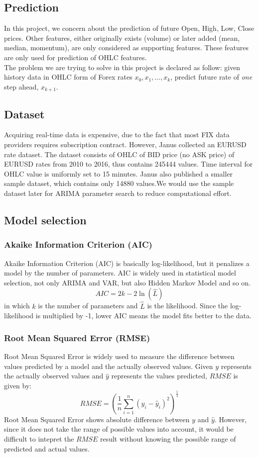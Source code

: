 \documentclass[11pt]{article}
\begin{document}

\subsection{Prediction}
In this project, we concern about the prediction of future Open, High, Low,
Close prices. Other features, either originally exists (volume) or later added
(mean, median, momentum), are only considered as supporting features. These
features are only used for prediction of OHLC features.\\
The problem we are trying to solve in this project is declared as follow: given
history data in OHLC form of Forex rates $x_0, x_1,\ldots,x_k$, predict future
rate of \textit{one} step ahead, $x_{k+1}$.

\subsection{Dataset}
Acquiring real-time data is expensive, due to the fact that most FIX data
providers requires subscription contract. However, Janus \cite{meehau16eurusd}
collected an EURUSD rate dataset. The dataset consists of OHLC of BID price (no
ASK price) of EURUSD rates from 2010 to 2016, thus contains 245444 values. Time
interval for OHLC value is uniformly set to 15 minutes. Janus also published a
smaller sample dataset, which contains only 14880 values.We would use the sample
dataset later for ARIMA parameter search to reduce computational effort.

\subsection{Model selection}
\subsubsection{Akaike Information Criterion (AIC)}
Akaike Information Criterion (AIC) is basically log-likelihood, but it penalizes a
model by the number of parameters. AIC is widely used in statistical model
selection, not only ARIMA and VAR, but also Hidden Markov Model and so on.
$$
AIC = 2k -2\ln(\hat{L})
$$
in which $k$ is the number of parameters and $\hat{L}$ is the likelihood. Since
the log-likelihood is multiplied by -1, lower AIC means the model fits better to
the data.

\subsubsection{Root Mean Squared Error (RMSE)}
Root Mean Squared Error is widely used to measure the difference between values
predicted by a model and the actually observed values. Given $y$ represents the
actually observed values and $\hat{y}$ represents the values predicted, $RMSE$
is given by:
$$
RMSE = \left( \frac{1}{n}\sum _{i=1}^{n}(y_i -\hat{y}_i)^2 \right)^\frac{1}{2}
$$
Root Mean Squared Error shows absolute difference between $y$ and $\hat{y}$.
However, since it does not take the range of possible values into account, it
would be difficult to intepret the $RMSE$ result without knowing the possible
range of predicted and actual values. 
\end{document}
